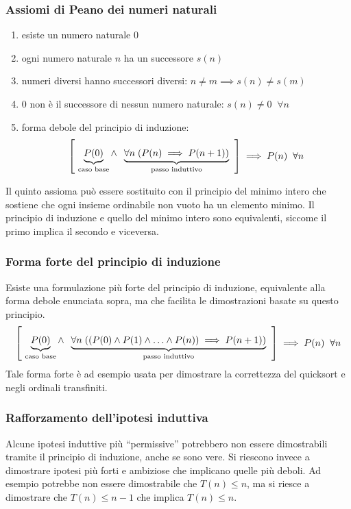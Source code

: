 \subsubsection*{Assiomi di Peano dei numeri naturali}
\begin{enumerate}
	\item esiste un numero naturale \(0\)
	\item ogni numero naturale \(n\) ha un successore \(s(n)\)
	\item numeri diversi hanno successori diversi: \(n \neq m \implies s(n) \neq s(m)\)
	\item \(0\) non è il successore di nessun numero naturale: \(s(n) \neq 0 \;\; \forall n\)
	\item forma debole del principio di induzione:
	\[\left[ \raisebox{3pt}{ \(\underbrace{P(0)}_{\text{caso base}} \wedge \;\; \underbrace{\forall n \; (P(n) \implies P(n + 1))}_{\text{passo induttivo}} \)} \;\; \right] \implies P(n) \;\; \forall n\]
\end{enumerate}

\vspace{5pt}

\noindent
Il quinto assioma può essere sostituito con il principio del minimo intero che sostiene che ogni insieme ordinabile non
vuoto ha un elemento minimo. Il principio di induzione e quello del minimo intero sono equivalenti, siccome il primo
implica il secondo e viceversa.

\subsubsection*{Forma forte del principio di induzione}
Esiste una formulazione più forte del principio di induzione, equivalente alla forma debole enunciata sopra, ma che facilita
le dimostrazioni basate su questo principio.
\[ \left[ \raisebox{3pt}{ \(\underbrace{P(0)}_{\text{caso base}} \wedge \;\; \underbrace{\forall n \; ((P(0) \wedge P(1) \wedge \ldots \wedge P(n)) \implies P(n + 1))}_{\text{passo induttivo}} \)} \;\; \right] \implies P(n) \;\; \forall n\]
Tale forma forte è ad esempio usata per dimostrare la correttezza del quicksort e negli ordinali transfiniti.

\subsubsection*{Rafforzamento dell'ipotesi induttiva}
Alcune ipotesi induttive più ``permissive'' potrebbero non essere dimostrabili tramite il principio di induzione, anche se
sono vere. Si riescono invece a dimostrare ipotesi più forti e ambiziose che implicano quelle più deboli. Ad esempio
potrebbe non essere dimostrabile che \(T(n) \leq n\), ma si riesce a dimostrare che \(T(n) \leq n - 1\) che implica
\(T(n) \leq n\).

